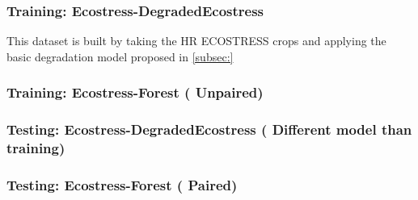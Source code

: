         \subsubsection{Training: Ecostress-DegradedEcostress}

            This dataset is built by taking the HR ECOSTRESS crops and applying the basic degradation model proposed in \ref{subsec:}

        \subsubsection{Training: Ecostress-Forest ( Unpaired)}

        \subsubsection{Testing: Ecostress-DegradedEcostress ( Different model than training)}

        \subsubsection{Testing: Ecostress-Forest ( Paired)}


\clearpage
